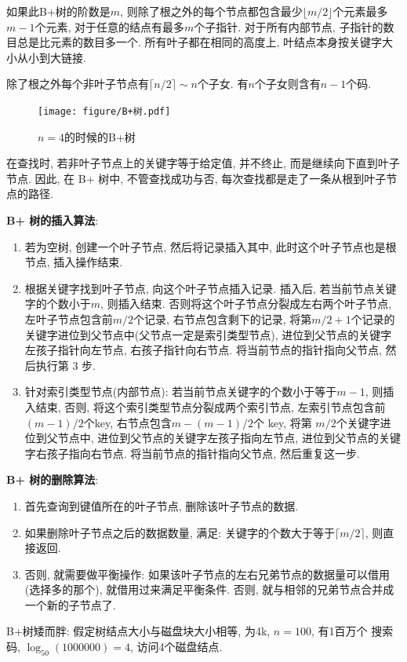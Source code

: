 如果此B+树的阶数是$m$, 则除了根之外的每个节点都包含最少$\lfloor m/2\rfloor$个元素最多 
$m-1$个元素, 对于任意的结点有最多$m$个子指针. 对于所有内部节点, 子指针的数目总是比元素的数目多一个. 所有叶子都在相同的高度上, 叶结点本身按关键字大小从小到大链接.

除了根之外每个非叶子节点有$\lceil n/2 \rceil \sim n$个子女. 有$n$个子女则含有$n-1$个码.
\begin{figure}[H]
    \centering
    \texttt{[image: figure/B+树.pdf]}
    \caption{$n=4$的时候的B+树}
\end{figure}

在查找时, 若非叶子节点上的关键字等于给定值, 并不终止, 而是继续向下直到叶子节点. 
因此, 在 B+ 树中, 不管查找成功与否, 每次查找都是走了一条从根到叶子节点的路径.


\textbf{B+ 树的插入算法}:
\begin{enumerate}
    \item 若为空树, 创建一个叶子节点, 然后将记录插入其中, 此时这个叶子节点也是根节点, 插入操作结束.
    \item 根据关键字找到叶子节点, 向这个叶子节点插入记录. 插入后, 若当前节点关键字的个数小于$m$, 则插入结束. 否则将这个叶子节点分裂成左右两个叶子节点, 左叶子节点包含前$m/2$个记录, 右节点包含剩下的记录, 将第$m/2+1$个记录的关键字进位到父节点中(父节点一定是索引类型节点), 进位到父节点的关键字左孩子指针向左节点, 右孩子指针向右节点. 将当前节点的指针指向父节点, 然后执行第 3 步.
    \item 针对索引类型节点(内部节点): 若当前节点关键字的个数小于等于$m-1$, 则插入结束, 否则, 将这个索引类型节点分裂成两个索引节点, 左索引节点包含前$ (m-1)/2 $个key, 右节点包含$ m-(m-1)/2 $个 key, 将第 $m/2$个关键字进位到父节点中, 进位到父节点的关键字左孩子指向左节点, 进位到父节点的关键字右孩子指向右节点. 将当前节点的指针指向父节点, 然后重复这一步.
\end{enumerate}

\textbf{B+ 树的删除算法}:
\begin{enumerate}
    \item 首先查询到键值所在的叶子节点, 删除该叶子节点的数据.
    \item 如果删除叶子节点之后的数据数量, 满足: 关键字的个数大于等于$\lceil m/2 \rceil$, 则直接返回.
    \item 否则, 就需要做平衡操作: 如果该叶子节点的左右兄弟节点的数据量可以借用(选择多的那个), 就借用过来满足平衡条件. 否则, 就与相邻的兄弟节点合并成一个新的子节点了.
\end{enumerate}

B+树矮而胖: 假定树结点大小与磁盘块大小相等, 为4k, $n=100$, 有1百万个
搜索码, $\log_{50}(1 000 000)= 4$, 访问4个磁盘结点.

